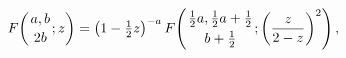 \[\mathop{F\/}\nolimits\!\left({a,b\atop 2b};z\right)=\left(1-\tfrac{1}{2}z%
\right)^{-a}\mathop{F\/}\nolimits\!\left({\tfrac{1}{2}a,\tfrac{1}{2}a+\tfrac{1%
}{2}\atop b+\tfrac{1}{2}};\left(\frac{z}{2-z}\right)^{2}\right),\]